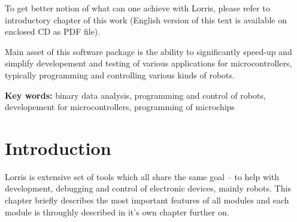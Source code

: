 \documentclass[12pt, a4paper, oneside]{article}
\newcommand{\D}{\medskip \noindent} %
\newcommand{\B}{\textbf} %
\begin{document}
To get better notion of what can one achieve with Lorris, please refer to introductory chapter of this work (English version of this text is available on enclosed CD as PDF file).

Main asset of this software package is the ability to significantly speed-up and simplify developement and testing of various applications for microcontrollers, typically programming and controlling various kinds of robots.

\D \B{Key words:} binary data analysis, programming and control of robots, developement for microcontrollers, programming of microchips

\addtolength{\textheight}{30mm} %

\newpage
\pagestyle{plain}

\setlength{\voffset}{-20mm} %
\setcounter{page}{1}  %

\tableofcontents  %

\addtolength{\textheight}{-30mm} %
\newpage
\setlength{\voffset}{0mm} %
\pagestyle{plain}


\section*{Introduction}
Lorris is extensive set of tools which all share the same goal -- to help with development, debugging and control of electronic devices, mainly robots. This chapter briefly describes the most important features of all modules and each module is throughly described in it's own chapter further on.
\end{document}
